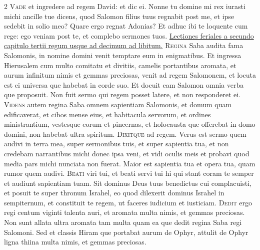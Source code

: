 \begin{multicols*}{2}
\lettrine[lines=2]{\zallmancaps \color{Red} V}{ade} et ingredere ad regem David: et dic ei. Nonne tu domine mi rex iurasti michi ancille tue dicens, quod Salomon filius tuus regnabit post me, et ipse sedebit in solio meo? Quare ergo regnat Adonias? Et adhuc ibi te loquente cum rege: ego veniam post te, et complebo sermones tuos.
\newline \ul{Lectiones feriales a secundo capitulo tertii regum usque ad decimum ad libitum.}
{\color{Red} }
\lettrine[lines=2]{\zallmancaps \color{Blue} R}{egina} Saba audita fama Salomonis, in nomine domini venit temptare eum in enigmatibus. Et ingressa Hierusalem cum multo comitatu et divitiis, camelis portantibus aromata, et aurum infinitum nimis et gemmas preciosas, venit ad regem Salomonem, et locuta est ei universa que habebat in corde suo. Et docuit eam Salomon omnia verba que proposuit. Non fuit sermo qui regem posset latere, et non responderet ei.
\lettrine[lines=2]{\zallmancaps \color{Red} V}{idens} autem regina Saba omnem sapientiam Salomonis, et domum quam edificaverat, et cibos mense eius, et habitacula servorum, et ordines ministrantium, vestesque eorum et pincernas, et holocausta que offerebat in domo domini, non habebat ultra spiritum.
\lettrine[lines=2]{\zallmancaps \color{Blue} D}{ixitque} ad regem. Verus est sermo quem audivi in terra mea, super sermonibus tuis, et super sapientia tua, et non credebam narrantibus michi donec ipsa veni, et vidi oculis meis et probavi quod media pars michi nunciata non fuerat. Maior est sapientia tua et opera tua, quam rumor quem audivi.
\lettrine[lines=2]{\zallmancaps \color{Red} B}{eati} viri tui, et beati servi tui hi qui stant coram te semper et audiunt sapientiam tuam. Sit dominus Deus tuus benedictus cui complacuisti, et posuit te super thronum Israhel, eo quod dilexerit dominus Israhel in sempiternum, et constituit te regem, ut faceres iudicium et iusticiam.
\lettrine[lines=2]{\zallmancaps \color{Blue} D}{edit} ergo regi centum viginti talenta auri, et aromata multa nimis, et gemmas preciosas. Non sunt allata ultra aromata tam multa quam ea que dedit regina Saba regi Salomoni. Sed et classis Hiram que portabat aurum de Ophyr, attulit de Ophyr ligna thiina multa nimis, et gemmas preciosas.

\end{multicols*}
